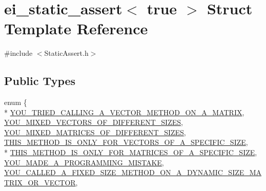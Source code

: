 \hypertarget{structei__static__assert_3_01true_01_4}{\section{ei\-\_\-static\-\_\-assert$<$ true $>$ Struct Template Reference}
\label{structei__static__assert_3_01true_01_4}
}


{\ttfamily \#include $<$Static\-Assert.\-h$>$}

\subsection*{Public Types}
\begin{DoxyCompactItemize}
\item 
enum \{ \\*
\hyperlink{structei__static__assert_3_01true_01_4_ada5f400d6b61aa0566ded13d516502e1abb28d19813733f93b96faef9185e6c70}{Y\-O\-U\-\_\-\-T\-R\-I\-E\-D\-\_\-\-C\-A\-L\-L\-I\-N\-G\-\_\-\-A\-\_\-\-V\-E\-C\-T\-O\-R\-\_\-\-M\-E\-T\-H\-O\-D\-\_\-\-O\-N\-\_\-\-A\-\_\-\-M\-A\-T\-R\-I\-X}, 
\hyperlink{structei__static__assert_3_01true_01_4_ada5f400d6b61aa0566ded13d516502e1ae187fc276a106560461d2557cd248ca9}{Y\-O\-U\-\_\-\-M\-I\-X\-E\-D\-\_\-\-V\-E\-C\-T\-O\-R\-S\-\_\-\-O\-F\-\_\-\-D\-I\-F\-F\-E\-R\-E\-N\-T\-\_\-\-S\-I\-Z\-E\-S}, 
\hyperlink{structei__static__assert_3_01true_01_4_ada5f400d6b61aa0566ded13d516502e1a5d66d32c3d3919fcf25c0fef5a69bec5}{Y\-O\-U\-\_\-\-M\-I\-X\-E\-D\-\_\-\-M\-A\-T\-R\-I\-C\-E\-S\-\_\-\-O\-F\-\_\-\-D\-I\-F\-F\-E\-R\-E\-N\-T\-\_\-\-S\-I\-Z\-E\-S}, 
\hyperlink{structei__static__assert_3_01true_01_4_ada5f400d6b61aa0566ded13d516502e1a189f6b677a9b30a33145c85245149d3a}{T\-H\-I\-S\-\_\-\-M\-E\-T\-H\-O\-D\-\_\-\-I\-S\-\_\-\-O\-N\-L\-Y\-\_\-\-F\-O\-R\-\_\-\-V\-E\-C\-T\-O\-R\-S\-\_\-\-O\-F\-\_\-\-A\-\_\-\-S\-P\-E\-C\-I\-F\-I\-C\-\_\-\-S\-I\-Z\-E}, 
\\*
\hyperlink{structei__static__assert_3_01true_01_4_ada5f400d6b61aa0566ded13d516502e1a2272091582570b31085ddbb57a75e96d}{T\-H\-I\-S\-\_\-\-M\-E\-T\-H\-O\-D\-\_\-\-I\-S\-\_\-\-O\-N\-L\-Y\-\_\-\-F\-O\-R\-\_\-\-M\-A\-T\-R\-I\-C\-E\-S\-\_\-\-O\-F\-\_\-\-A\-\_\-\-S\-P\-E\-C\-I\-F\-I\-C\-\_\-\-S\-I\-Z\-E}, 
\hyperlink{structei__static__assert_3_01true_01_4_ada5f400d6b61aa0566ded13d516502e1a476a81b09b1aef2881b3da92f674a4cf}{Y\-O\-U\-\_\-\-M\-A\-D\-E\-\_\-\-A\-\_\-\-P\-R\-O\-G\-R\-A\-M\-M\-I\-N\-G\-\_\-\-M\-I\-S\-T\-A\-K\-E}, 
\hyperlink{structei__static__assert_3_01true_01_4_ada5f400d6b61aa0566ded13d516502e1aedf57602b36b0140943c8765caf4cb93}{Y\-O\-U\-\_\-\-C\-A\-L\-L\-E\-D\-\_\-\-A\-\_\-\-F\-I\-X\-E\-D\-\_\-\-S\-I\-Z\-E\-\_\-\-M\-E\-T\-H\-O\-D\-\_\-\-O\-N\-\_\-\-A\-\_\-\-D\-Y\-N\-A\-M\-I\-C\-\_\-\-S\-I\-Z\-E\-\_\-\-M\-A\-T\-R\-I\-X\-\_\-\-O\-R\-\_\-\-V\-E\-C\-T\-O\-R}, 

\end{DoxyCompactItemize}
